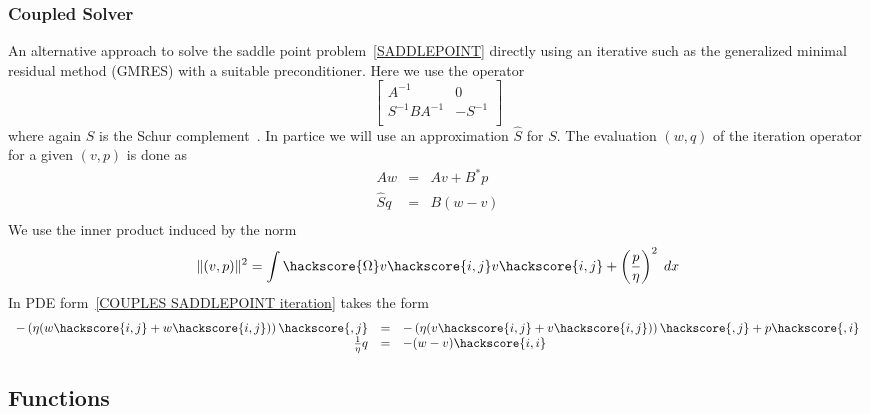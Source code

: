 \subsubsection{Coupled Solver}
An alternative approach to solve the saddle point problem~\ref{SADDLEPOINT} directly using an iterative such as 
the generalized minimal residual method (GMRES)  with a suitable
preconditioner. Here we use the operator 
\begin{equation}
\left[ \begin{array}{cc}
A^{-1}     & 0 \\
S^{-1} B A^{-1}  & -S^{-1} \\
\end{array} \right]
\label{SADDLEPOINT PRECODITIONER}
\end{equation}
where again $S$ is the Schur complement~\cite{ELMAN}. In partice we will use an approximation $\hat{S}$ for $S$. The evaluation $(w,q)$ of the iteration operator for a given $(v,p)$ is done as 
\begin{equation}
\begin{array}{rcl}
A w & = & Av+B^{*}p \\
\hat{S} q & = & B(w-v) \\
\end{array}
\label{COUPLES SADDLEPOINT iteration}
\end{equation}
We use the inner product induced by the norm
\begin{equation}
\|(v,p)\|^2= \int\hackscore{\Omega}  v\hackscore{i,j}  v\hackscore{i,j} + \left( \frac{p}{\eta}\right)^2\; dx
\label{COUPLES NORM}
\end{equation}
In PDE form~\ref{COUPLES SADDLEPOINT iteration} takes the form
\begin{equation}
\begin{array}{rcl}
-\left(\eta(w\hackscore{i,j}+ w\hackscore{i,j})\right)\hackscore{,j} & = & -\left(\eta(v\hackscore{i,j}+ v\hackscore{i,j})\right)\hackscore{,j}+p\hackscore{,i} \\
\frac{1}{\eta}  q & = & - (w-v)\hackscore{i,i} \\
\end{array}
\label{SADDLEPOINT iteration 2}
\end{equation}


\subsection{Functions}

